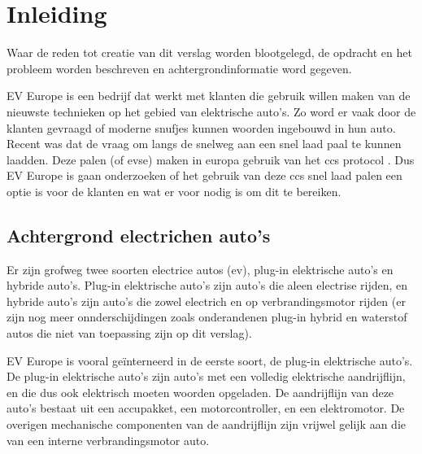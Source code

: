 \chapter{Inleiding}
\label{inleiding}

\begin{center}
    \begin{minipage}{0.5\textwidth}
        \begin{small}
            Waar de reden tot creatie van dit verslag worden blootgelegd, de
            opdracht en het probleem worden beschreven en achtergrondinformatie
            word gegeven.
        \end{small}
    \end{minipage}
    \vspace{0.5cm}
\end{center}

\noindent EV Europe is een bedrijf dat werkt met klanten die gebruik willen
maken van de nieuwste technieken op het gebied van elektrische auto's. Zo word
er vaak door de klanten gevraagd of moderne snufjes kunnen woorden ingebouwd in
hun auto. Recent was dat de vraag om langs de snelweg aan een snel laad paal te
kunnen laadden. Deze palen (of \ac{evse}) maken in europa gebruik van het \ac{ccs}
protocol \cite{Directive_2014/94/EU}. Dus EV Europe is gaan onderzoeken of het
gebruik van deze \ac{ccs} snel laad palen een optie is voor de klanten en wat er
voor nodig is om dit te bereiken.

\section{Achtergrond electrichen auto's}

Er zijn grofweg twee soorten electrice autos (\ac{ev}), plug-in elektrische auto's en
hybride auto's. Plug-in elektrische auto's zijn auto's die aleen electrise
rijden, en hybride auto's zijn auto's die zowel electrich en op
verbrandingsmotor rijden (er zijn nog meer onnderschijdingen zoals onderandenen
plug-in hybrid en waterstof autos die niet van toepassing zijn op dit verslag).

EV Europe is vooral geïnterneerd in de eerste soort, de plug-in elektrische
auto's. De plug-in elektrische auto's zijn auto's met een volledig elektrische
aandrijflijn, en die dus ook elektrisch moeten woorden opgeladen. De
aandrijflijn van deze auto's bestaat uit een accupakket, een motorcontroller,
en een elektromotor. De overigen mechanische componenten van de aandrijflijn
zijn vrijwel gelijk aan die van een interne verbrandingsmotor auto.

